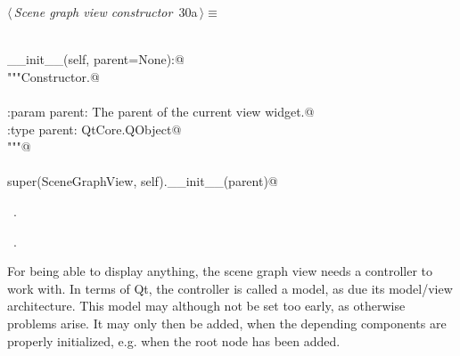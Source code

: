 \documentclass[
    a4paper,      %
    10pt,         %
    openright,    %
    notitlepage,  %
    parskip=half, %
]{scrreprt}       %
\theoremstyle{definition}                    %
\begin{document}
\begin{flushleft} \small
\begin{minipage}{\linewidth}\label{scrap32}\raggedright\small
{} $\langle\,${\itshape Scene graph view constructor}\nobreak\ {\footnotesize {30a}}$\,\rangle\equiv$
\vspace{-1ex}
\begin{list}{}{} \item
\mbox{}\lstinline@@\\
\mbox{}\lstinline@def __init__(self, parent=None):@\\
\mbox{}\lstinline@    """Constructor.@\\
\mbox{}\lstinline@@\\
\mbox{}\lstinline@    :param parent:        The parent of the current view widget.@\\
\mbox{}\lstinline@    :type parent:         QtCore.QObject@\\
\mbox{}\lstinline@    """@\\
\mbox{}\lstinline@@\\
\mbox{}\lstinline@    super(SceneGraphView, self).__init__(parent)@\\
\mbox{}\lstinline@@{\NWsep}
\end{list}
\vspace{-1.5ex}
\footnotesize
\begin{list}{}{\setlength{\itemsep}{-\parsep}\setlength{\itemindent}{-\leftmargin}}
\item \NWtxtMacroDefBy\ .
\item \NWtxtMacroRefIn\ .

\item{}
\end{list}
\end{minipage}\vspace{4ex}
\end{flushleft}
For being able to display anything, the scene graph view needs a controller to
work with. In terms of Qt, the controller is called a model, as due its
model/view architecture. This model may although not be set too early, as
otherwise problems arise. It may only then be added, when the depending
components are properly initialized, e.g. when the root node has been added.
\end{document}
